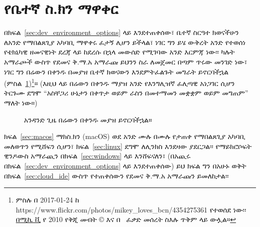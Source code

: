 



\section{የቤተኛ ስ.ክን ማዋቀር} %
\label{sec:native_os_setup}

በክፍል~\ref{sec:dev_environment_options} ላይ እንደተጠቀሰው፣ ቤተኛ ስርዓተ ክወናችሁን ለአንድ የማበልጸጊያ አካባቢ ማዋቀሩ ፈታኝ ሊሆን ይችላል፣ ነገር ግን ይሄ ውቅረት አንድ የተወሰነ የቴክኒካዊ ዘመናዊነት ደረጃ ላይ ከደረሱ በኋላ መውሰድ የሚገባው አንድ እርምጃ ነው፡፡ ካሉት አማራጮች ውስጥ የደመና ቅ.ማ.አ አማራጩ ይህንን ስራ ለመጀመር በጣም ጥሩው መንገድ ነው፣ ነገር ግን በሬውን በቀንዱ በመያዝ ቤተኛ ክወናውን እንደምትፈልጉት መግራት ይኖርባችኋል (ምስል~\ref{fig:grab_bull_by_horns})\footnote{ምስሉ በ 2017-01-24 ከ https://www.flickr.com/photos/mikey\_loves\_bcn/4354275361 የተወሰደ ነው፡፡ \href{https://www.flickr.com/photos/mikey_loves_bcn/}{በሚኪ ቪ} የ 2010 የቅጂ መብት © እና በ \ccbync\ ፈቃድ መሰረት ስእሉ ጥቅም ላይ ውሏል።}። (እዚህ ላይ በሬውን በቀንዱ ማያዝ አንድ የእንግሊዝኛ ፈሊጣዊ አነጋገር ሲሆን ትርጉሙ ደግሞ ``አስቸጋሪ ሁኔታን በቀጥታ ወይም ራስን በመተማመን መቋቋም ወይም መግጠም'' ማለት ነው።)

\begin{figure}
\begin{center}
\end{center}
\caption{አንዳንድ ጊዜ በሬውን በቀንዱ መያዝ ይኖርባችኋል።\label{fig:grab_bull_by_horns}}
\end{figure}

ክፍል~\ref{sec:macos} ማክስ.ክን (macOS) ወደ አንድ ሙሉ በሙሉ የታጠቀ የማበልጸጊያ አካባቢ መለወጥን የሚሸፍን ሲሆን፣ ክፍል~\ref{sec:linux} ደግሞ ለሊንክስ እንደዛው ያደርጋል፡፡ የማይክሮሶፍት ዊንዶውስ አማራጪን በክፍል~\ref{sec:windows} ላይ እንሸፍናለን፣ (በአጪሩ በክፍል~\ref{sec:dev_environment_options} ላይ እንደተጠቀሰው) ይህ ክፍል ግን በአሁኑ ወቅት በክፍል~\ref{sec:cloud_ide} ውስጥ የተጠቀሰውን የደመና ቅ.ማ.አ አማራጩን ይመለከታል፡፡

